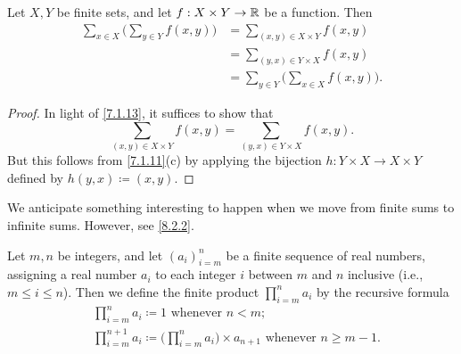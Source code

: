 \begin{cor}\label{7.1.14}
  Let \(X, Y\) be finite sets, and let \(f : X \times Y \to \mathbb{R}\) be a function.
  Then
  \begin{align*}
    \sum_{x \in X} \bigg(\sum_{y \in Y} f(x, y)\bigg) & = \sum_{(x, y) \in X \times Y} f(x, y)               \\
                                                      & = \sum_{(y, x) \in Y \times X} f(x, y)               \\
                                                      & = \sum_{y \in Y} \bigg(\sum_{x \in X} f(x, y)\bigg).
  \end{align*}
\end{cor}

\begin{proof}
  In light of \cref{7.1.13}, it suffices to show that
  \[
    \sum_{(x, y) \in X \times Y} f(x, y) = \sum_{(y, x) \in Y \times X} f(x, y).
  \]
  But this follows from \cref{7.1.11}(c) by applying the bijection \(h : Y \times X \to X \times Y\) defined by \(h(y, x) \coloneqq (x, y)\).
\end{proof}

\begin{rmk}\label{7.1.15}
  We anticipate something interesting to happen when we move from finite sums to infinite sums.
  However, see \cref{8.2.2}.
\end{rmk}

\begin{ac}\label{ac:7.1.1}
  Let \(m, n\) be integers, and let \((a_i)_{i = m}^n\) be a finite sequence of real numbers, assigning a real number \(a_i\) to each integer \(i\) between \(m\) and \(n\) inclusive (i.e., \(m \leq i \leq n\)).
  Then we define the finite product \(\prod_{i = m}^n a_i\) by the recursive formula
  \begin{align*}
     & \prod_{i = m}^n a_i \coloneqq 1 \text{ whenever } n < m;                                                             \\
     & \prod_{i = m}^{n + 1} a_i \coloneqq \Bigg(\prod_{i = m}^n a_i\Bigg) \times a_{n + 1} \text{ whenever } n \geq m - 1.
  \end{align*}
\end{ac}

